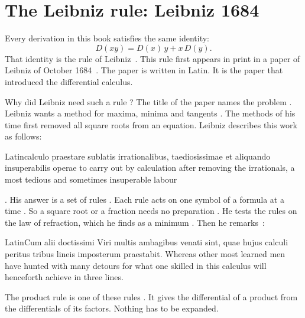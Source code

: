 \section[The Leibniz rule: Leibniz 1684][The Leibniz rule]{The Leibniz rule: Leibniz 1684}\label{sec:origins:leibniz-rule}

Every derivation in this book satisfies the same identity:
\[
  D(xy) = D(x)\,y + x\,D(y).
\]
That identity is the rule of Leibniz~\cite{Leibniz1684}.
This rule first appears in print in a paper of Leibniz of October
1684~\cite{Leibniz1684}. The paper is written in Latin. It is the paper that
introduced the differential calculus.

Why did Leibniz need such a rule \cite[p.~472]{Leibniz1684}? The title of the
paper names the problem \cite[p.~472]{Leibniz1684}. Leibniz wants a method for
maxima, minima and tangents \cite[p.~472]{Leibniz1684}  \cite[p.~472]{Leibniz1684}. The methods of his time first
removed all square roots from an equation. Leibniz describes this work as
follows: \begin{originalquote}{Latin}{calculo praestare sublatis
irrationalibus, taediosissimae et aliquando insuperabilis operae} to carry out
by calculation after removing the irrationals, a most tedious and sometimes
insuperable labour \end{originalquote} \noindent\cite[p.~472]{Leibniz1684}.
His answer is a set of rules \cite[p.~472]{Leibniz1684}. Each rule acts on one symbol of a formula at a
time \cite[p.~472]{Leibniz1684}. So a square root or a fraction needs no preparation \cite[p.~472]{Leibniz1684}. He tests the rules
on the law of refraction, which he finds as a minimum \cite[p.~472]{Leibniz1684}. Then he
remarks~\cite[p.~472]{Leibniz1684}: \begin{originalquote}{Latin}{Cum alii
doctissimi Viri multis ambagibus venati sint, quae hujus calculi peritus
tribus lineis imposterum praestabit.} Whereas other most learned men have
hunted with many detours for what one skilled in this calculus will henceforth
achieve in three lines. \end{originalquote} \noindent The product rule is one
of these rules \cite[p.~467]{Leibniz1684}. It gives the differential of a product from the
differentials of its factors. Nothing has to be expanded.

